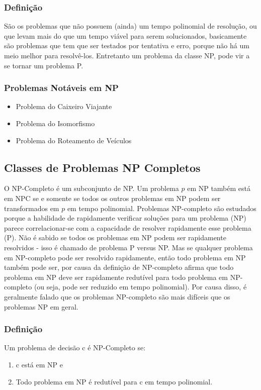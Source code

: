 \documentclass[12pt]{article}
\begin{document}
        \subsubsection{Definição}
            São os problemas que não possuem (ainda) um tempo polinomial de resolução, ou que levam mais do que um tempo viável para serem solucionados, basicamente são problemas que tem que ser testados por tentativa e erro, porque não há um meio melhor para resolvê-los.
            Entretanto um problema da classe NP, pode vir a se tornar um problema P. 
        \subsubsection{Problemas Notáveis em NP}
            \begin{itemize}
                \item Problema do Caixeiro Viajante
                \item Problema do Isomorfismo
                \item Problema do Roteamento de Veículos
            \end{itemize}

    \subsection{Classes de Problemas NP Completos}
        O NP-Completo é um subconjunto de NP. 
        Um problema $p$ em NP também está em NPC se e somente se todos os outros problemas em NP podem ser transformados em $p$ em tempo polinomial.
        Problemas NP-completo são estudados porque a habilidade de rapidamente verificar soluções para um problema (NP) parece correlacionar-se com a capacidade de resolver rapidamente esse problema (P). Não é sabido se todos os problemas em NP podem ser rapidamente resolvidos - isso é chamado de problema P versus NP. Mas se qualquer problema em NP-completo pode ser resolvido rapidamente, então todo problema em NP também pode ser, por causa da definição de NP-completo afirma que todo problema em NP deve ser rapidamente redutível para todo problema em NP-completo (ou seja, pode ser reduzido em tempo polinomial). Por causa disso, é geralmente falado que os problemas NP-completo são mais difíceis que os problemas NP em geral.
        \subsubsection{Definição}
            Um problema de decisão c é NP-Completo se:
            \begin{enumerate}
                \item c está em NP e
                \item Todo problema em NP é redutível para c em tempo polinomial.
            \end{enumerate}
\end{document}
